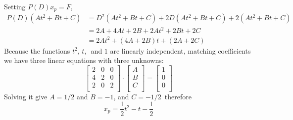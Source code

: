 \begin{enumerate}
    Setting $P(D)x_ p= F$,
    \begin{align*}
      P(D)(At^2+Bt+C)
      &= D^2(At^2+Bt+C) + 2D(At^2+Bt+C) + 2(At^2+Bt+C) \\
      &= 2A + 4At + 2B + 2At^2 + 2Bt + 2C \\
      &= 2At^2 + (4A + 2B)t + (2A + 2C)                        
    \end{align*}
    Because the functions $t^2,\, t,\, $ and $1$ are linearly independent,
    matching coefficients we have three linear equations with three unknowns:
    \[
      \begin{bmatrix}
        2 & 0 & 0 \\
        4 & 2 & 0 \\
        2 & 0 & 2 \\
      \end{bmatrix}
      \cdot
      \begin{bmatrix}
        A \\
        B \\
        C \\
      \end{bmatrix}
      =
      \begin{bmatrix}
        1 \\
        0 \\
        0 \\
      \end{bmatrix}
    \]   
    Solving it give $A = 1/2$ and $B = -1$, and $C = -1/2 \,$ therefore
    \begin{equation*}
      x _p = \frac{1}{2} t^2  - t -\frac{1}{2}
    \end{equation*}
\end{enumerate}


\clearpage

